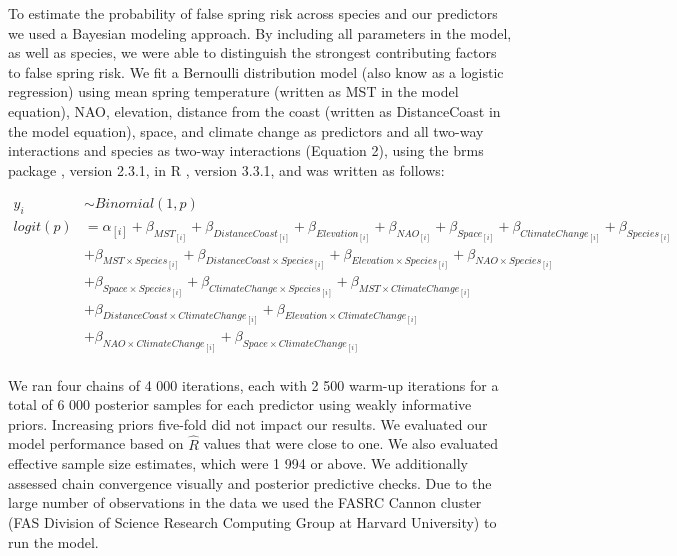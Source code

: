 \documentclass{article}\usepackage[]{graphicx}\usepackage[]{color}
\begin{document}
To estimate the probability of false spring risk across species and our predictors we used a Bayesian modeling approach. By including all parameters in the model, as well as species, we were able to distinguish the strongest contributing factors to false spring risk. We fit a Bernoulli distribution model (also know as a logistic regression) using mean spring temperature (written as MST in the model equation), NAO, elevation, distance from the coast (written as DistanceCoast in the model equation), space, and climate change as predictors and all two-way interactions and species as two-way interactions (Equation 2), using the brms package \citep{brms}, version 2.3.1,  in R \citep{R}, version 3.3.1, and was written as follows:

\begin{align*}
 y_i & \sim Binomial(1,p) \tag{2} \\
logit(p) &= \alpha_{[i]} + \beta_{MST_{[i]}} + \beta_{DistanceCoast_{[i]}} + \beta_{Elevation_{[i]}} + \beta_{NAO_{[i]}} + \beta_{Space_{[i]}} + \beta_{ClimateChange_{[i]}} + \beta_{Species_{[i]}} \\ 
  &+ \beta_{MST \times Species_{[i]}} + \beta_{DistanceCoast \times Species_{[i]}} + \beta_{Elevation \times Species_{[i]}} + \beta_{NAO \times Species_{[i]}}\\
  &+ \beta_{Space \times Species_{[i]}} + \beta_{ClimateChange \times Species_{[i]}} + \beta_{MST \times ClimateChange_{[i]}}\\ 
  &+ \beta_{DistanceCoast \times ClimateChange_{[i]}} + \beta_{Elevation \times ClimateChange_{[i]}}\\ 
  &+ \beta_{NAO \times ClimateChange_{[i]}} + \beta_{Space \times ClimateChange_{[i]}} \nonumber\\
\end{align*}

We ran four chains of 4 000 iterations, each with 2 500 warm-up iterations for a total of 6 000 posterior samples for each predictor using weakly informative priors. Increasing priors five-fold did not impact our results. We evaluated our model performance based on $\hat{R}$ values that were close to one. We also evaluated effective sample size estimates, which were 1 994 or above. We additionally assessed chain convergence visually and posterior predictive checks. Due to the large number of observations in the data we used the FASRC Cannon cluster (FAS Division of Science Research Computing Group at Harvard University) to run the model. 
\end{document}
